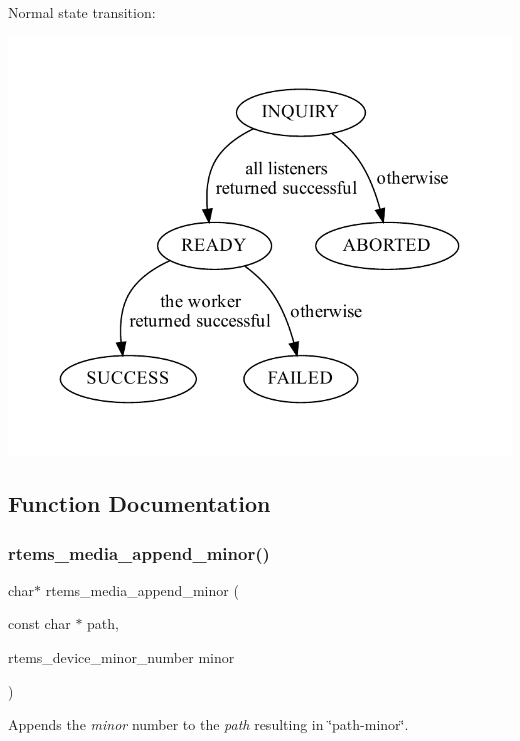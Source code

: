 Normal state transition\+: 
\begin{DoxyImageNoCaption}
  \mbox{\includegraphics[width=\textwidth,height=\textheight/2,keepaspectratio=true]{dot_inline_dotgraph_3}}
\end{DoxyImageNoCaption}
 

\subsection{Function Documentation}
\mbox{\label{group__RTEMSIOMedia_gaa27ae6204e7202e9bfcb82f606ceeb43}} 
\subsubsection{\texorpdfstring{rtems\_media\_append\_minor()}{rtems\_media\_append\_minor()}}
{\footnotesize\ttfamily char$\ast$ rtems\+\_\+media\+\_\+append\+\_\+minor (\begin{DoxyParamCaption}\item[{const char $\ast$}]{path,  }\item[{rtems\+\_\+device\+\_\+minor\+\_\+number}]{minor }\end{DoxyParamCaption})}



Appends the {\itshape minor} number to the {\itshape path} resulting in \char`\"{}path-\/minor\char`\"{}. 

